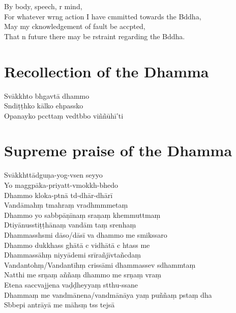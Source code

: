 
By body, speech, r mind,\\
For whatever wrng action I have cmmitted towards the Bddha,\\
May my cknowledgement of fault be accpted,\\
That n future there may be rstraint regarding the Bddha.

\clearpage

\chapter{Recollection of the Dhamma}%

\begin{leader}
\end{leader}

Svākkhto bhgavtā dhammo\\
Sndiṭṭhko kālko ehpassko\\
Opanayko pccttaṃ vedtbbo viññūhī'ti

\chapter{Supreme praise of the Dhamma}%

\begin{leader}
\end{leader}

Svākkhttādguṇa-yog-vsen seyyo\\
Yo maggpāka-priyatt-vmokkh-bhedo\\
Dhammo kloka-ptnā td-dhār-dhārī\\
Vandāmahṃ tmahraṃ vradhmmmetaṃ\\
Dhammo yo sabbpāṇīnaṃ sraṇaṃ khemmuttmaṃ\\
Dtiyānusstiṭṭhānaṃ vandām taṃ srenhaṃ\\
Dhammasshsmi dāso/dāsī va dhammo me smikssaro\\
Dhammo dukkhass ghātā c vidhātā c htass me\\
Dhammassāhṃ niyyādemi srīrañjīvtañcdaṃ\\
Vandantohṃ/Vandantīhṃ crissāmi dhammassev sdhammtaṃ\\
Natthi me srṇaṃ aññaṃ dhammo me srṇaṃ vraṃ\\
Etena saccvajjena vaḍḍheyyaṃ stthu-ssane\\
Dhammaṃ me vandmānena/vandmānāya yaṃ puññaṃ pstaṃ dha\\
Sbbepi antrāyā me māhsṃ tss tejsā

